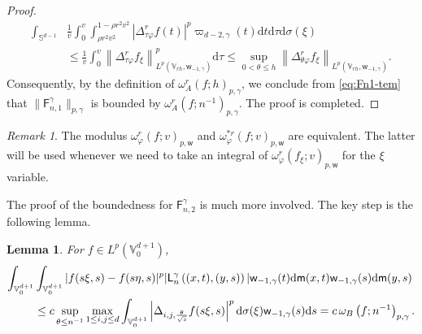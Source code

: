\documentclass{amsart}
\newtheorem{lem}[thm]{Lemma}
\theoremstyle{remark}
\newtheorem{rem}{Remark}[section]\newtheorem*{notation}{Notation}
\def\d{\mathrm{d}}
\def\sph{{\mathbb{S}^{d-1}}}
\def\g{{\gamma}}
\def\k{{\kappa}}
\def\t{{\theta}}
\def\o{{\omega}}
\def\s{\sigma}
\def\SS{{\mathbb S}}
\def\VV{{\mathbb V}}
\def\d{\mathrm{d}}
\def\sph{{\mathbb{S}^{d-1}}}
\def\sF{{\mathsf F}}
\def\sL{{\mathsf L}}
\def\sd{{\mathsf d}}
\def\sm{{\mathsf m}}
\def\sw{{\mathsf w}}
\def\g{{\gamma}}
\def\k{{\kappa}}
\def\t{{\theta}}
\def\o{{\omega}}
\def\s{\sigma}
\def\SS{{\mathbb S}}
\def\VV{{\mathbb V}}
\begin{document}
\begin{proof}
\begin{align*}
  \int_{\sph} & \frac1 v  \int_0^v  \int_{\rho {r^2v^2}}^{1- \rho r^2 v^2} \left | \Delta_{\tau\varphi}^r f(t) \right |^p 
      \varpi_{d-2,\g}(t)\d t \d \tau  \d \s(\xi) \\
      &  \le  \frac1 v  \int_0^v \left\|  \Delta_{\tau \varphi}^r f_\xi \right \|_{L^p(\VV_{r h},\sw_{-1,\g}) }^p \d \tau
       \le   \sup_{0<\t \le h} \left\| \Delta_{\t\varphi}^r f_\xi \right\|_{L^p( \VV_{r h},\sw_{-1,\g})}.
 \end{align*}
  Consequently, by the 
definition of $\omega_A^r (f; h)_{p,\g}$, we conclude from \eqref{eq:Fn1-tem} that $\|\sF_{n,1}^\g\|_{p,\g}$ is bounded by 
$\omega_A^r (f; n^{-1})_{p,\g}$. The proof is completed. 
\end{proof}
 
\begin{rem} \label{rem:o_*r}
The modulus $\o_{\varphi}^{r} (f; v)_{p, \sw}$ and  $\o_{\varphi}^{*r} (f; v)_{p, \sw}$ are equivalent. The latter will be used
whenever we need to take an integral of $\o_{\varphi}^{r} (f_\xi; v)_{p, \sw}$ for the $\xi$ variable. 
\end{rem}
 
The proof of the boundedness for $\sF_{n,2}^\g$ is much more involved. The key step is the following
lemma. 

\begin{lem} \label{lem:key_lem1}
For $f \in L^p(\VV_0^{d+1})$, 
\begin{align*} %
  \int_{\VV_0^{d+1}} & \int_{\VV_0^{d+1}}  
      |f(s\xi,s) - f(s\eta,s)|^p |\sL_{n}^{\gamma}\left( (x,t),(y,s)\right)| \sw_{-1,\gamma}(t) \d \sm(x,t) 
        \sw_{-1,\gamma}(s) \d \sm(y,s) \notag \\
    & \le c \sup_{\t \le n^{-1}} \max_{1 \le i,j\le d} \int_{\VV_0^{d+1}} \left| \Delta_{i,j,\frac{\t}{\sqrt{s}}}f(s\xi,s)\right|^p \d \s(\xi)\sw_{-1,\g}(s)\d s
     = c\, \omega_B \left(f; n^{-1}\right)_{p,\g}.  
\end{align*}
\end{lem}
\end{document}
